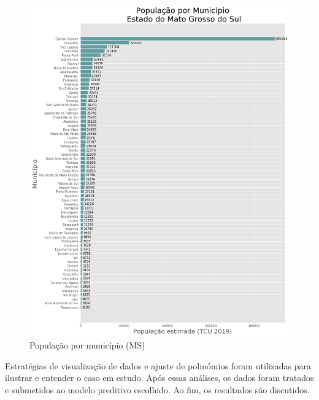 \documentclass[12pt]{article}
\begin{document}
\begin{figure}[!htb]
  \centering
  \includegraphics[width=1\textwidth]{figs/pop_por_municipio.png}
  \caption{População por município (MS)}
  \label{fig:popuMuniMS}
  \end{figure}


  Estratégias de visualização de dados e ajuste de polinómios foram utilizadas para ilustrar e entender o caso em estudo. Após essas análises, os dados foram tratados e submetidos ao modelo preditivo escolhido. Ao fim, os resultados são discutidos.
\end{document}
